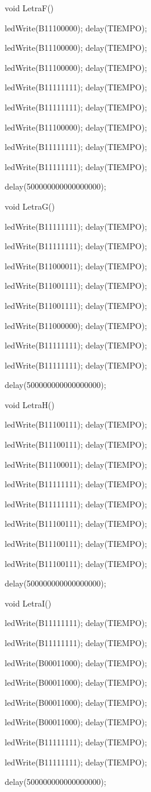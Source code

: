 \documentclass{article}
\begin{document}
void LetraF(){
   
   ledWrite(B11100000); delay(TIEMPO);
   
   ledWrite(B11100000); delay(TIEMPO);
   
   ledWrite(B11100000); delay(TIEMPO);
   
   ledWrite(B11111111); delay(TIEMPO);
   
   ledWrite(B11111111); delay(TIEMPO);
   
   ledWrite(B11100000); delay(TIEMPO);
   
   ledWrite(B11111111); delay(TIEMPO);
   
   ledWrite(B11111111); delay(TIEMPO);
   
   delay(500000000000000000);}

void LetraG(){
   
   ledWrite(B11111111); delay(TIEMPO);
   
   ledWrite(B11111111); delay(TIEMPO);
   
   ledWrite(B11000011); delay(TIEMPO);
   
   ledWrite(B11001111); delay(TIEMPO);
   
   ledWrite(B11001111); delay(TIEMPO);
   
   ledWrite(B11000000); delay(TIEMPO);
   
   ledWrite(B11111111); delay(TIEMPO);
   
   ledWrite(B11111111); delay(TIEMPO);
  
  delay(500000000000000000);}

void LetraH(){
   
   ledWrite(B11100111); delay(TIEMPO);
   
   ledWrite(B11100111); delay(TIEMPO);
   
   ledWrite(B11100011); delay(TIEMPO);
   
   ledWrite(B11111111); delay(TIEMPO);
   
   ledWrite(B11111111); delay(TIEMPO);
   
   ledWrite(B11100111); delay(TIEMPO);
   
   ledWrite(B11100111); delay(TIEMPO);
   
   ledWrite(B11100111); delay(TIEMPO);
   
   delay(500000000000000000);}

void LetraI(){
   
   ledWrite(B11111111); delay(TIEMPO);
   
   ledWrite(B11111111); delay(TIEMPO);
   
   ledWrite(B00011000); delay(TIEMPO);
   
   ledWrite(B00011000); delay(TIEMPO);
   
   ledWrite(B00011000); delay(TIEMPO);
   
   ledWrite(B00011000); delay(TIEMPO);
   
   ledWrite(B11111111); delay(TIEMPO);
   
   ledWrite(B11111111); delay(TIEMPO);
   
   delay(500000000000000000);}
\end{document}

